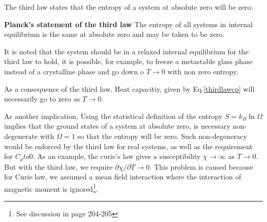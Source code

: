 \documentclass{article}
\begin{document}
The third law states that the entropy of a system at absolute zero will be zero:

\textbf{Planck's statement of the third law} The entropy of all systems in internal
equilibrium is the same at absolute zero and may be taken to be zero.

It is noted that the system should be in a relaxed internal equilibrium for the third law
to hold, it is possible,
for example, to freeze a metastable glass phase instead of a crystalline phase and go down
o $T \to 0$ with non zero entropy.

As a consequence of the third law, Heat capacitiy, given by Eq.\ref{thirdlawcp} will
necessarily go to zero as $T\to0$.

As another implication, Using the statistical definition of the entropy $S = k_B \ln \Omega$
implies that the ground states of a system at absolute zero, is necessary non-degenerate with
$\Omega = 1$ so that the entropy will be zero. Such non-degeneracy would be enforced by the 
third law for real systems, as well as the requirement for $C_pto 0$. 
As an example, the curie's law gives a susceptibility $\chi \to \infty$ as $T \to 0$. But with
the third law, we require $\partial \chi / \partial T \to 0$. This problem is caused because
for Curie law, we assumed a mean field interaction where the interaction of magnetic
moment is ignored\footnote{See discussion in page 204-205}. 
\end{document}
